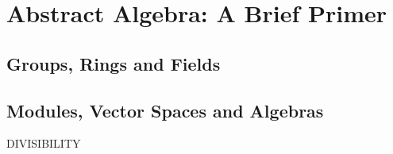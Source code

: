 \section{Abstract Algebra: A Brief Primer}

\subsection{Groups, Rings and Fields}






\subsection{Modules, Vector Spaces and Algebras}









DIVISIBILITY


